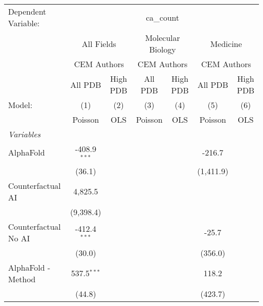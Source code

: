 \begingroup
\centering
\begin{tabular}{lcccccc}
   \tabularnewline \midrule \midrule
   Dependent Variable: & \multicolumn{6}{c}{ca\_count}\\
 & \multicolumn{2}{c}{All Fields} & \multicolumn{2}{c}{Molecular Biology} & \multicolumn{2}{c}{Medicine} \\
\cmidrule(lr){2-3} \cmidrule(lr){4-5} \cmidrule(lr){6-7}
 & \multicolumn{2}{c}{CEM Authors} & \multicolumn{2}{c}{CEM Authors} & \multicolumn{2}{c}{CEM Authors} \\
\cmidrule(lr){2-3} \cmidrule(lr){4-5} \cmidrule(lr){6-7}
 & \multicolumn{1}{c}{All PDB} & \multicolumn{1}{c}{High PDB} & \multicolumn{1}{c}{All PDB} & \multicolumn{1}{c}{High PDB} & \multicolumn{1}{c}{All PDB} & \multicolumn{1}{c}{High PDB} \\
\cmidrule(lr){2-2} \cmidrule(lr){3-3} \cmidrule(lr){4-4} \cmidrule(lr){5-5} \cmidrule(lr){6-6} \cmidrule(lr){7-7}
   Model:                                                     & (1)            & (2)  & (3)     & (4)  & (5)        & (6)\\  
                                                              &  Poisson       & OLS  & Poisson & OLS  & Poisson    & OLS\\  
   \midrule
   \emph{Variables}\\
   AlphaFold                                                  & -408.9$^{***}$ &      &         &      & -216.7     &   \\   
                                                              & (36.1)         &      &         &      & (1,411.9)  &   \\   
   Counterfactual AI                                          & 4,825.5        &      &         &      &            &   \\   
                                                              & (9,398.4)      &      &         &      &            &   \\   
   Counterfactual No AI                                       & -412.4$^{***}$ &      &         &      & -25.7      &   \\   
                                                              & (30.0)         &      &         &      & (356.0)    &   \\   
   AlphaFold - Method                                         & 537.5$^{***}$  &      &         &      & 118.2      &   \\   
                                                              & (44.8)         &      &         &      & (423.7)    &   \\   

\end{tabular}
